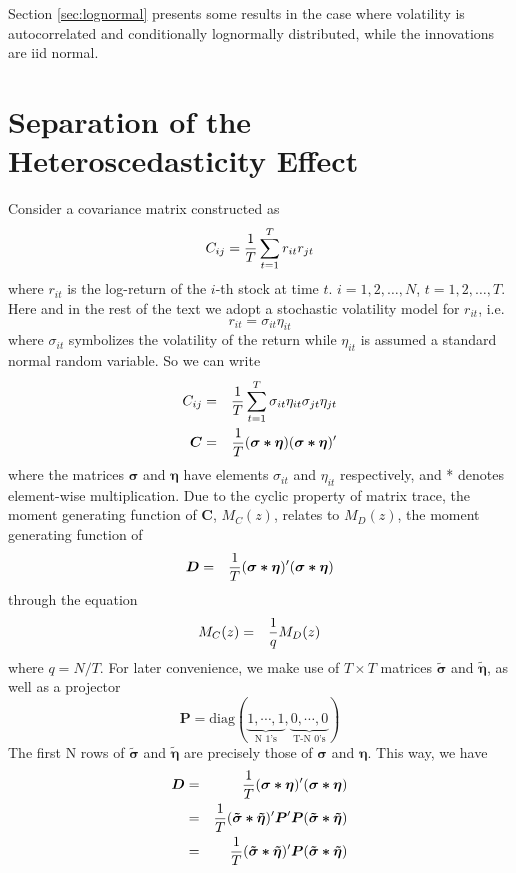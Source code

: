 \documentclass{article}
\begin{document}
Section \ref{sec:lognormal} presents some results in the case where
volatility is autocorrelated and conditionally lognormally
distributed, while the innovations are iid normal.

\section{Separation of the Heteroscedasticity Effect}\label{sec:sep}
Consider a covariance matrix constructed as
$$
C_{ij} = {1 \over T}\sum_{t=1}^T r_{it} r_{jt}
$$
where $r_{it}$ is the log-return of the $i$-th stock at time $t$. $i =
1, 2, \dots, N$, $t = 1,2,\dots,T$. Here and in the rest of the
text we adopt a stochastic volatility model for $r_{it}$, i.e.
$$
r_{it} = \sigma_{it} \eta_{it}
$$
where $\sigma_{it}$ symbolizes the volatility of the return while
$\eta_{it}$ is assumed a standard normal random variable.
So we can write
\begin{eqnarray}
C_{ij} &=& {1 \over T}\sum_{t=1}^T \sigma_{it} \eta_{it} \sigma_{jt}
\eta_{jt} \nonumber \\
\bm{C} &=& {1 \over T} (\bm{\sigma * \eta}) (\bm{\sigma *
  \eta})' \label{eq:C}
\end{eqnarray}
where the matrices $\bm{\sigma}$ and $\bm{\eta}$ have elements
$\sigma_{it}$ and $\eta_{it}$ respectively, and * denotes element-wise
multiplication. Due to the cyclic property of matrix trace, the
moment generating function of $\bm{C}$, $M_C(z)$, relates to $M_D(z)$,
the moment generating function of
\begin{eqnarray*}
  \bm{D} &=& {1 \over T} (\bm{\sigma * \eta})' (\bm{\sigma * \eta})
\end{eqnarray*}
through the equation
\begin{eqnarray*}
  M_C(z) &=& {1 \over q} M_D(z)
\end{eqnarray*}
where $q = N/T$. For later convenience, we make use of $T \times T$
matrices $\bm{\tilde{\sigma}}$ and $\bm{\tilde{\eta}}$, as well as a
projector
$$
\bm{P} = \text{diag}(\underbrace{1, \cdots, 1}_{\text{N 1's}}, 
\underbrace{0, \cdots, 0}_{\text{T-N 0's}})
$$
The first N rows of $\tilde{\bm{\sigma}}$ and $\bm{\tilde{\eta}}$ are
precisely those of $\bm{\sigma}$ and $\bm{\eta}$. This way, we have
\begin{eqnarray*}
\bm D &=& {1 \over T} (\bm{\sigma * \eta})' (\bm{\sigma * \eta}) \\
&=& {1 \over T} (\bm{\tilde{\sigma} * \tilde{\eta}})' \bm P'
\bm P (\bm{\tilde{\sigma} * \tilde{\eta}}) \\
&=& {1 \over T} (\bm{\tilde{\sigma} * \tilde{\eta}})'
\bm P (\bm{\tilde{\sigma} * \tilde{\eta}}) \\
\end{eqnarray*}
\end{document}
